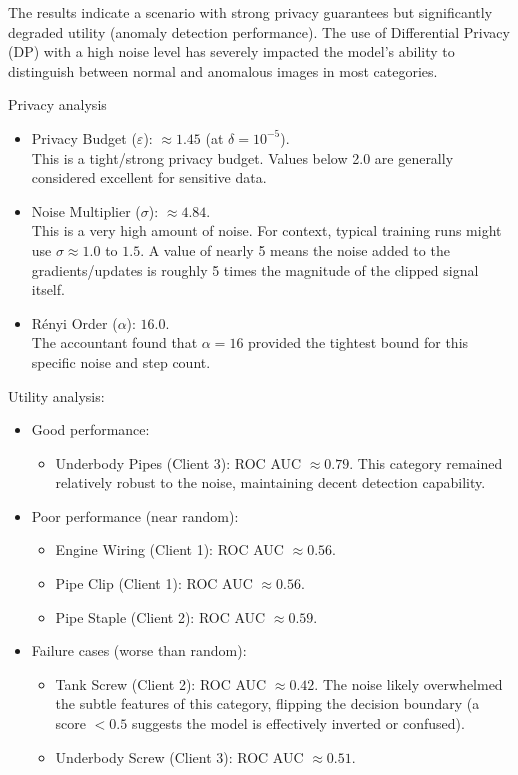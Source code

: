 \documentclass{article}
\begin{document}
The results indicate a scenario with strong privacy guarantees but significantly degraded utility (anomaly detection performance).
The use of Differential Privacy (DP) with a high noise level has severely impacted the model's ability to distinguish between normal and anomalous images in most categories.

Privacy analysis
\begin{itemize}
    \item Privacy Budget ($\varepsilon$): $\approx 1.45$ (at $\delta = 10^{-5}$).\\
    \hspace*{1.5em}This is a tight/strong privacy budget. Values below 2.0 are generally considered excellent for sensitive data.
    \item Noise Multiplier ($\sigma$): $\approx 4.84$.\\
    \hspace*{1.5em}This is a very high amount of noise. For context, typical training runs might use $\sigma \approx 1.0$ to $1.5$. A value of nearly 5 means the noise added to the gradients/updates is roughly 5 times the magnitude of the clipped signal itself.
    \item Rényi Order ($\alpha$): $16.0$.\\
    \hspace*{1.5em}The accountant found that $\alpha = 16$ provided the tightest bound for this specific noise and step count.
\end{itemize}

Utility analysis:
\begin{itemize}
    \item Good performance:
    \begin{itemize}
        \item Underbody Pipes (Client 3): ROC AUC $\approx 0.79$.
        This category remained relatively robust to the noise, maintaining decent detection capability.
    \end{itemize}

    \item Poor performance (near random):
    \begin{itemize}
        \item Engine Wiring (Client 1): ROC AUC $\approx 0.56$.
        \item Pipe Clip (Client 1): ROC AUC $\approx 0.56$.
        \item Pipe Staple (Client 2): ROC AUC $\approx 0.59$.
    \end{itemize}

    \item Failure cases (worse than random):
    \begin{itemize}
        \item Tank Screw (Client 2): ROC AUC $\approx 0.42$.
        The noise likely overwhelmed the subtle features of this category, flipping the decision boundary (a score $<0.5$ suggests the model is effectively inverted or confused).
        \item Underbody Screw (Client 3): ROC AUC $\approx 0.51$.
    \end{itemize}
\end{itemize}
\end{document}
